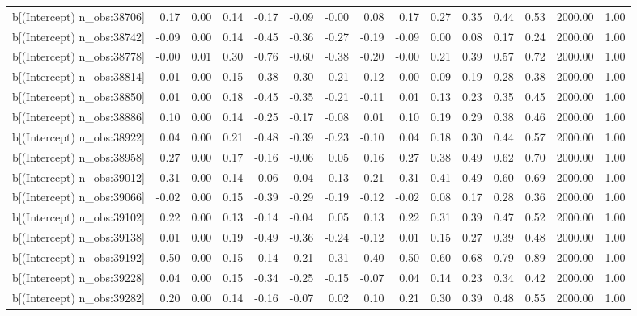 \begin{table}[ht]
\begin{tabular}{rrrrrrrrrrrrrrr}
  b[(Intercept) n\_obs:38706] & 0.17 & 0.00 & 0.14 & -0.17 & -0.09 & -0.00 & 0.08 & 0.17 & 0.27 & 0.35 & 0.44 & 0.53 & 2000.00 & 1.00 \\ 
  b[(Intercept) n\_obs:38742] & -0.09 & 0.00 & 0.14 & -0.45 & -0.36 & -0.27 & -0.19 & -0.09 & 0.00 & 0.08 & 0.17 & 0.24 & 2000.00 & 1.00 \\ 
  b[(Intercept) n\_obs:38778] & -0.00 & 0.01 & 0.30 & -0.76 & -0.60 & -0.38 & -0.20 & -0.00 & 0.21 & 0.39 & 0.57 & 0.72 & 2000.00 & 1.00 \\ 
  b[(Intercept) n\_obs:38814] & -0.01 & 0.00 & 0.15 & -0.38 & -0.30 & -0.21 & -0.12 & -0.00 & 0.09 & 0.19 & 0.28 & 0.38 & 2000.00 & 1.00 \\ 
  b[(Intercept) n\_obs:38850] & 0.01 & 0.00 & 0.18 & -0.45 & -0.35 & -0.21 & -0.11 & 0.01 & 0.13 & 0.23 & 0.35 & 0.45 & 2000.00 & 1.00 \\ 
  b[(Intercept) n\_obs:38886] & 0.10 & 0.00 & 0.14 & -0.25 & -0.17 & -0.08 & 0.01 & 0.10 & 0.19 & 0.29 & 0.38 & 0.46 & 2000.00 & 1.00 \\ 
  b[(Intercept) n\_obs:38922] & 0.04 & 0.00 & 0.21 & -0.48 & -0.39 & -0.23 & -0.10 & 0.04 & 0.18 & 0.30 & 0.44 & 0.57 & 2000.00 & 1.00 \\ 
  b[(Intercept) n\_obs:38958] & 0.27 & 0.00 & 0.17 & -0.16 & -0.06 & 0.05 & 0.16 & 0.27 & 0.38 & 0.49 & 0.62 & 0.70 & 2000.00 & 1.00 \\ 
  b[(Intercept) n\_obs:39012] & 0.31 & 0.00 & 0.14 & -0.06 & 0.04 & 0.13 & 0.21 & 0.31 & 0.41 & 0.49 & 0.60 & 0.69 & 2000.00 & 1.00 \\ 
  b[(Intercept) n\_obs:39066] & -0.02 & 0.00 & 0.15 & -0.39 & -0.29 & -0.19 & -0.12 & -0.02 & 0.08 & 0.17 & 0.28 & 0.36 & 2000.00 & 1.00 \\ 
  b[(Intercept) n\_obs:39102] & 0.22 & 0.00 & 0.13 & -0.14 & -0.04 & 0.05 & 0.13 & 0.22 & 0.31 & 0.39 & 0.47 & 0.52 & 2000.00 & 1.00 \\ 
  b[(Intercept) n\_obs:39138] & 0.01 & 0.00 & 0.19 & -0.49 & -0.36 & -0.24 & -0.12 & 0.01 & 0.15 & 0.27 & 0.39 & 0.48 & 2000.00 & 1.00 \\ 
  b[(Intercept) n\_obs:39192] & 0.50 & 0.00 & 0.15 & 0.14 & 0.21 & 0.31 & 0.40 & 0.50 & 0.60 & 0.68 & 0.79 & 0.89 & 2000.00 & 1.00 \\ 
  b[(Intercept) n\_obs:39228] & 0.04 & 0.00 & 0.15 & -0.34 & -0.25 & -0.15 & -0.07 & 0.04 & 0.14 & 0.23 & 0.34 & 0.42 & 2000.00 & 1.00 \\ 
  b[(Intercept) n\_obs:39282] & 0.20 & 0.00 & 0.14 & -0.16 & -0.07 & 0.02 & 0.10 & 0.21 & 0.30 & 0.39 & 0.48 & 0.55 & 2000.00 & 1.00 \\ 

\end{tabular}
\end{table}
